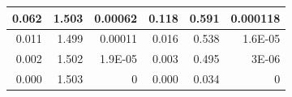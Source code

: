 \documentclass[titlepage]{jarticle}
\begin{document}
\begin{table}[htbp]
\begin{center}
\begin{tabular}{r|r|r|r|r|r}
            0.062                                  & 1.503                       & 0.00062                     & 0.118                                  & 0.591                       & 0.000118                   \\ \hline
            0.011                                  & 1.499                       & 0.00011                     & 0.016                                  & 0.538                       & 1.6E-05                    \\ \hline
            0.002                                  & 1.502                       & 1.9E-05                     & 0.003                                  & 0.495                       & 3E-06                      \\ \hline
            0.000                                  & 1.503                       & 0                           & 0.000                                  & 0.034                       & 0                          \\ \hline
        \end{tabular}
    \end{center}
    \label{トランジスタ入力特性測定結果（1.5V）}
\end{table}
\end{document}
